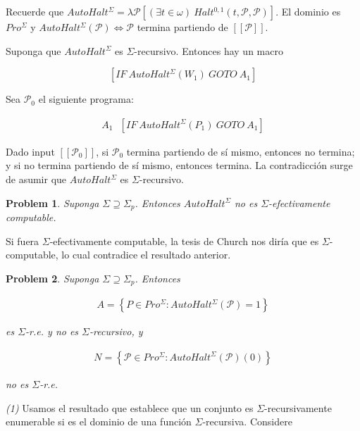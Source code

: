 \documentclass[a4paper, 12pt]{article}
\newtheorem{problem}{Problem}
\newtheorem{problem}{Problem}
\begin{document}
Recuerde que $AutoHalt^{\Sigma} = \lambda \mathcal{P} \left[ (\exists t \in
\omega) ~ Halt^{0, 1}(t, \mathcal{P}, \mathcal{P})  \right]$. El dominio es
$Pro^{\Sigma}$ y $AutoHalt^{\Sigma}(\mathcal{P}) \iff \mathcal{P}$ termina
partiendo de $[\![ \mathcal{P} ]\!]$.

Suponga que $AutoHalt^{\Sigma}$ es $\Sigma$-recursivo. Entonces hay un macro

$$[IF ~ AutoHalt^{\Sigma}(W_1) ~ GOTO ~ A_1]$$

Sea $\mathcal{P}_0$ el siguiente programa:

\begin{align*}
    A_1 ~ ~ ~ [IF ~ AutoHalt^{\Sigma}(P_1) ~ GOTO ~ A_1]
\end{align*}

Dado input $[\![ \mathcal{P}_0 ]\!]$, si $\mathcal{P}_0$ termina partiendo de sí
mismo, entonces no termina; y si no termina partiendo de sí mismo, entonces
termina. La contradicción surge de asumir que $AutoHalt^{\Sigma}$ es
$\Sigma$-recursivo.

\begin{problem}
    Suponga $\Sigma \supseteq \Sigma_p$. Entonces $AutoHalt^{\Sigma}$ no es
    $\Sigma$-efectivamente computable.
\end{problem}

Si fuera $\Sigma$-efectivamente computable, la tesis de Church nos diría que es
$\Sigma$-computable, lo cual contradice el resultado anterior.

\begin{problem}
    Suponga $\Sigma \supseteq \Sigma_p$. Entonces 

    \begin{align*}
        A = \left\{ P \in Pro^{\Sigma} : AutoHalt^{\Sigma}(\mathcal{P}) = 1
        \right\}
    \end{align*}

    es $\Sigma$-r.e. y no es $\Sigma$-recursivo, y 

    \begin{align*}
        N = \left\{ \mathcal{P} \in Pro^{\Sigma} :
        AutoHalt^{\Sigma}(\mathcal{P})(0) \right\} 
    \end{align*}

    no es $\Sigma$-r.e.
\end{problem}

\textit{(1)} Usamos el resultado que establece que un conjunto es
$\Sigma$-recursivamente enumerable si es el dominio de una función
$\Sigma$-recursiva. Considere 
\end{document}
